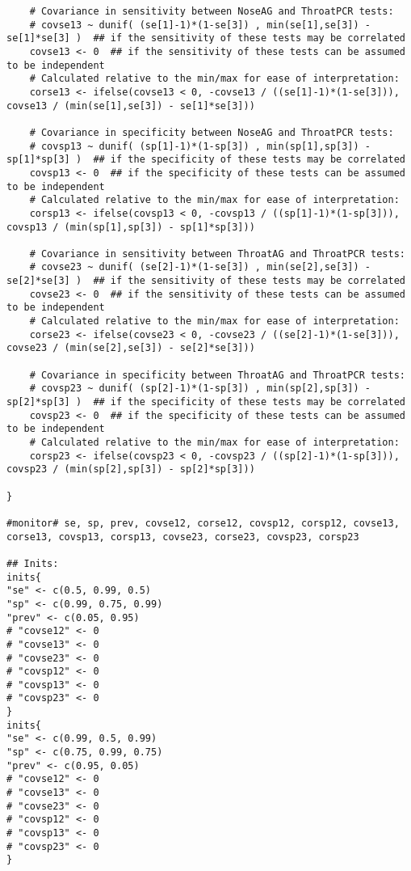 \documentclass[
  ignorenonframetext,
  aspectratio=169,
]{beamer}
\begin{document}
\begin{frame}[fragile]
\begin{verbatim}
    # Covariance in sensitivity between NoseAG and ThroatPCR tests:
    # covse13 ~ dunif( (se[1]-1)*(1-se[3]) , min(se[1],se[3]) - se[1]*se[3] )  ## if the sensitivity of these tests may be correlated
    covse13 <- 0  ## if the sensitivity of these tests can be assumed to be independent
    # Calculated relative to the min/max for ease of interpretation:
    corse13 <- ifelse(covse13 < 0, -covse13 / ((se[1]-1)*(1-se[3])), covse13 / (min(se[1],se[3]) - se[1]*se[3]))

    # Covariance in specificity between NoseAG and ThroatPCR tests:
    # covsp13 ~ dunif( (sp[1]-1)*(1-sp[3]) , min(sp[1],sp[3]) - sp[1]*sp[3] )  ## if the specificity of these tests may be correlated
    covsp13 <- 0  ## if the specificity of these tests can be assumed to be independent
    # Calculated relative to the min/max for ease of interpretation:
    corsp13 <- ifelse(covsp13 < 0, -covsp13 / ((sp[1]-1)*(1-sp[3])), covsp13 / (min(sp[1],sp[3]) - sp[1]*sp[3]))

    # Covariance in sensitivity between ThroatAG and ThroatPCR tests:
    # covse23 ~ dunif( (se[2]-1)*(1-se[3]) , min(se[2],se[3]) - se[2]*se[3] )  ## if the sensitivity of these tests may be correlated
    covse23 <- 0  ## if the sensitivity of these tests can be assumed to be independent
    # Calculated relative to the min/max for ease of interpretation:
    corse23 <- ifelse(covse23 < 0, -covse23 / ((se[2]-1)*(1-se[3])), covse23 / (min(se[2],se[3]) - se[2]*se[3]))

    # Covariance in specificity between ThroatAG and ThroatPCR tests:
    # covsp23 ~ dunif( (sp[2]-1)*(1-sp[3]) , min(sp[2],sp[3]) - sp[2]*sp[3] )  ## if the specificity of these tests may be correlated
    covsp23 <- 0  ## if the specificity of these tests can be assumed to be independent
    # Calculated relative to the min/max for ease of interpretation:
    corsp23 <- ifelse(covsp23 < 0, -covsp23 / ((sp[2]-1)*(1-sp[3])), covsp23 / (min(sp[2],sp[3]) - sp[2]*sp[3]))

}

#monitor# se, sp, prev, covse12, corse12, covsp12, corsp12, covse13, corse13, covsp13, corsp13, covse23, corse23, covsp23, corsp23

## Inits:
inits{
"se" <- c(0.5, 0.99, 0.5)
"sp" <- c(0.99, 0.75, 0.99)
"prev" <- c(0.05, 0.95)
# "covse12" <- 0
# "covse13" <- 0
# "covse23" <- 0
# "covsp12" <- 0
# "covsp13" <- 0
# "covsp23" <- 0
}
inits{
"se" <- c(0.99, 0.5, 0.99)
"sp" <- c(0.75, 0.99, 0.75)
"prev" <- c(0.95, 0.05)
# "covse12" <- 0
# "covse13" <- 0
# "covse23" <- 0
# "covsp12" <- 0
# "covsp13" <- 0
# "covsp23" <- 0
}
\end{verbatim}

\normalsize
\end{frame}
\end{document}
